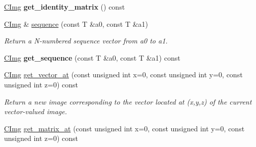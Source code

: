 \begin{DoxyCompactItemize}
\item 
\hypertarget{structcimg__library_1_1_c_img_a3f202a057d1bf445f01a7ef60a9e8092}{
\hyperlink{structcimg__library_1_1_c_img}{CImg} {\bfseries get\_\-identity\_\-matrix} () const }
\label{structcimg__library_1_1_c_img_a3f202a057d1bf445f01a7ef60a9e8092}

\item 
\hypertarget{structcimg__library_1_1_c_img_afa14119eeae2df407635589375793ff8}{
\hyperlink{structcimg__library_1_1_c_img}{CImg} \& \hyperlink{structcimg__library_1_1_c_img_afa14119eeae2df407635589375793ff8}{sequence} (const T \&a0, const T \&a1)}
\label{structcimg__library_1_1_c_img_afa14119eeae2df407635589375793ff8}

\begin{DoxyCompactList}\small\item\em Return a N-\/numbered sequence vector from {\ttfamily a0} to {\ttfamily a1}. \item\end{DoxyCompactList}\item 
\hypertarget{structcimg__library_1_1_c_img_a02b819bc961c5de472d275f0cb91964f}{
\hyperlink{structcimg__library_1_1_c_img}{CImg} {\bfseries get\_\-sequence} (const T \&a0, const T \&a1) const }
\label{structcimg__library_1_1_c_img_a02b819bc961c5de472d275f0cb91964f}

\item 
\hypertarget{structcimg__library_1_1_c_img_a0d2b8a72f62d8e15722f9c4c97c33ebf}{
\hyperlink{structcimg__library_1_1_c_img}{CImg} \hyperlink{structcimg__library_1_1_c_img_a0d2b8a72f62d8e15722f9c4c97c33ebf}{get\_\-vector\_\-at} (const unsigned int x=0, const unsigned int y=0, const unsigned int z=0) const }
\label{structcimg__library_1_1_c_img_a0d2b8a72f62d8e15722f9c4c97c33ebf}

\begin{DoxyCompactList}\small\item\em Return a new image corresponding to the vector located at ({\ttfamily x},{\ttfamily y},{\ttfamily z}) of the current vector-\/valued image. \item\end{DoxyCompactList}\item 
\hypertarget{structcimg__library_1_1_c_img_a13317c2700b6c7e4cb0567b9ae1f03ab}{
\hyperlink{structcimg__library_1_1_c_img}{CImg} \hyperlink{structcimg__library_1_1_c_img_a13317c2700b6c7e4cb0567b9ae1f03ab}{get\_\-matrix\_\-at} (const unsigned int x=0, const unsigned int y=0, const unsigned int z=0) const }
\label{structcimg__library_1_1_c_img_a13317c2700b6c7e4cb0567b9ae1f03ab}


\end{DoxyCompactItemize}

